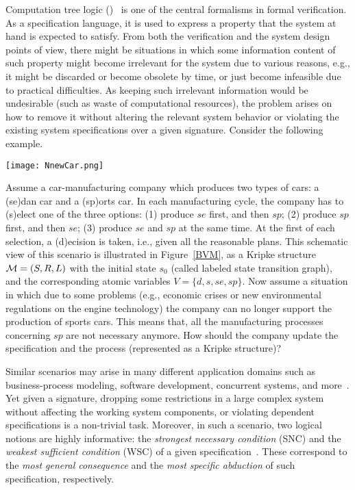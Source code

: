 \documentclass[twoside,11pt]{article}
\begin{document}
Computation tree logic (\CTL)~\cite{clarke1981design} is one of the central formalisms in formal verification. As a specification language, it is used to express a property
that the system at hand is expected to satisfy.
From both the verification and the system design points
of view,  there might be situations in which some information content of such property might become irrelevant for the system due to various reasons, e.g., it might be discarded or become obsolete by time, or just  become infeasible due to practical difficulties. As keeping such irrelevant information would be undesirable (such as waste of computational resources), the problem arises on how to remove it without altering the
relevant system behavior or violating the existing system
specifications over a given signature. Consider the following example.
\begin{figure*}[ht]
	\centering
	\texttt{[image: NnewCar.png]}\\
	\caption{Car engine manufacturing scenario}\label{BVM}
\end{figure*}
\begin{example}\label{car_manufacturing}
	Assume a car-manufacturing company which produces two types of cars: a (se)dan car and a (sp)orts car. In each manufacturing cycle, the company has to (s)elect one of the three options: (1) produce $se$  first, and then $sp$; (2) produce $sp$ first, and then $se$; (3) produce $se$ and $sp$ at the same time. At the first of each selection, a (d)ecision is taken, i.e., given all the reasonable plans. This schematic view of this scenario is illustrated in Figure~\ref{BVM}, as a  Kripke structure ${\cal M}=(S, R, L)$ with the initial state $s_0$ (called labeled state transition graph),  and the corresponding atomic variables $V=\{d,s,se,sp\}$.
	Now assume a situation in which due to some problems (e.g., economic crises or new environmental regulations on the engine technology) the company can no longer support the production of sports cars.
	This means that, all the manufacturing processes concerning $sp$ are not  necessary anymore. How should the company update the specification and the process (represented as a Kripke structure)?
	
	
	
\end{example}

 Similar scenarios may arise in many different application domains such as business-process modeling, software development, concurrent systems, and more~\cite{Baier:PMC:2008}. Yet given a signature, dropping some restrictions in a large  complex system  without affecting the working system components, or violating dependent specifications is a non-trivial task.
 Moreover, in such a scenario, two logical notions are highly informative: the \emph{strongest necessary condition} (SNC) and the \emph{weakest sufficient condition}  (WSC)  of a given specification~\cite{DBLP:Lin:AIJ:2001}.
 These correspond to the \emph{most general consequence} and the \emph{most specific abduction} of such specification, respectively.
\end{document}
